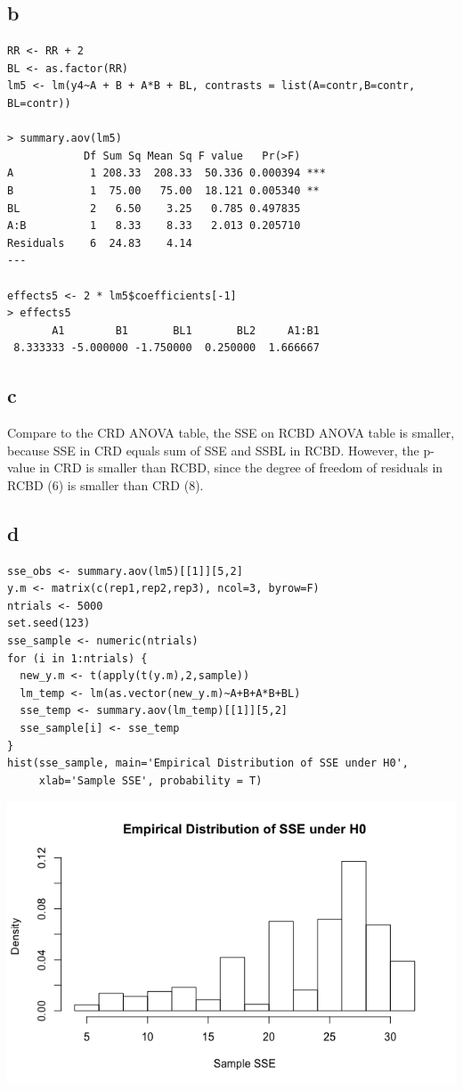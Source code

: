\documentclass[11pt,letterpaper]{article}
\begin{document}
\subsection*{b}
\begin{verbatim}
RR <- RR + 2
BL <- as.factor(RR)
lm5 <- lm(y4~A + B + A*B + BL, contrasts = list(A=contr,B=contr, BL=contr))

> summary.aov(lm5)
            Df Sum Sq Mean Sq F value   Pr(>F)    
A            1 208.33  208.33  50.336 0.000394 ***
B            1  75.00   75.00  18.121 0.005340 ** 
BL           2   6.50    3.25   0.785 0.497835    
A:B          1   8.33    8.33   2.013 0.205710    
Residuals    6  24.83    4.14                 
---

effects5 <- 2 * lm5$coefficients[-1]
> effects5
       A1        B1       BL1       BL2     A1:B1 
 8.333333 -5.000000 -1.750000  0.250000  1.666667 
\end{verbatim}

\subsection*{c}
\noindent Compare to the CRD ANOVA table, the SSE on RCBD ANOVA table is smaller, because SSE in CRD equals sum of SSE and SSBL in RCBD. However, the p-value in CRD is smaller than RCBD, since the degree of freedom of residuals in RCBD (6) is smaller than CRD (8). 

\subsection*{d}
\begin{verbatim}
sse_obs <- summary.aov(lm5)[[1]][5,2]
y.m <- matrix(c(rep1,rep2,rep3), ncol=3, byrow=F)
ntrials <- 5000
set.seed(123)
sse_sample <- numeric(ntrials)
for (i in 1:ntrials) {
  new_y.m <- t(apply(t(y.m),2,sample))
  lm_temp <- lm(as.vector(new_y.m)~A+B+A*B+BL)
  sse_temp <- summary.aov(lm_temp)[[1]][5,2]
  sse_sample[i] <- sse_temp
}
hist(sse_sample, main='Empirical Distribution of SSE under H0', 
     xlab='Sample SSE', probability = T)
\end{verbatim}
\includegraphics[scale=0.55]{lect-17-2-d.png}
\end{document}

